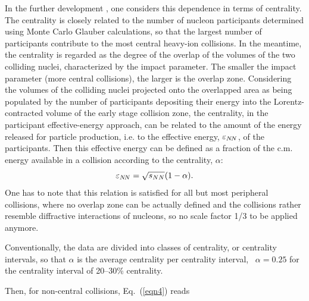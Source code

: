 \documentclass[twocolumn,showpacs,preprintnumbers,prd,superscriptaddress,nofootinbib]{revtex4}
\begin{document}
 In the 
 further development  , 
 one 
 considers 
 this dependence 
 in
terms of centrality.
 The centrality 
 is closely 
related to the number of nucleon participants
 determined using Monte Carlo Glauber calculations, 
  so that 
  the largest number of participants 
  contribute to the most central heavy-ion collisions. 
 In the meantime, the centrality is 
 regarded as the degree  of the overlap of the  volumes of the 
 two colliding  nuclei, 
 characterized  by the impact parameter.
 The smaller the impact parameter (more central collisions), the
larger is  the overlap zone.
 Considering the 
 volumes of the colliding nuclei projected onto the
overlapped area 
 as 
being populated by the number of 
participants depositing their energy into the 
Lorentz-contracted volume of the early stage collision zone, the 
centrality, in the participant effective-energy approach, can 
  be  
 related to the amount of the energy 
 released
 for 
 particle production, 
 i.e.   to the effective energy, $\varepsilon_{N\!N}$, of  
the participants.
 Then
 this effective energy 
 can be 
defined as 
a fraction of the c.m. energy available in a collision according to the 
centrality, $\alpha$:
 \begin{equation}
\varepsilon_{N\!N} = \sqrt{s_{NN}}(1 - \alpha).
\label{Eeff}
\end{equation}
  One has to note that this relation is satisfied for all but most 
peripheral collisions, where no overlap zone can be actually defined 
and the collisions rather resemble diffractive interactions of 
nucleons, 
so no scale factor 1/3 to be applied anymore. 

  Conventionally, the data are divided into 
 classes of centrality, or 
  centrality intervals, so that $\alpha$ is the average 
 centrality per 
 centrality interval, \eg\ $\alpha = 0.25$ for the centrality 
  interval of 
 20--30\% centrality.

Then, for non-central collisions, 
 Eq.~(\ref{eqn4})  
 reads
 
\end{document}
